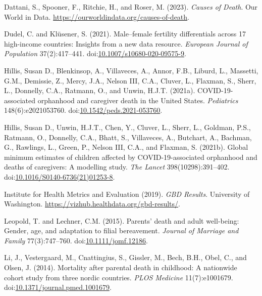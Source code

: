 \documentclass[
  11pt,
  letterpaper,
]{article}
\newlength{\cslhangindent}
\newlength{\cslentryspacingunit} %
\newenvironment{CSLReferences}[2] %
 {%
  \setlength{\parindent}{0pt}
  \ifodd #1
  \let\oldpar\par
  \def\par{\hangindent=\cslhangindent\oldpar}
  \fi
  \setlength{\parskip}{#2\cslentryspacingunit}
 }%
 {}
\begin{document}
\begin{CSLReferences}{1}{0}
\leavevmode{}%
Dattani, S., Spooner, F., Ritchie, H., and Roser, M. (2023). \emph{Causes of Death}. Our World in Data. \url{https://ourworldindata.org/causes-of-death}.

\leavevmode{}%
Dudel, C. and Klüsener, S. (2021). Male--female fertility differentials across 17 high-income countries: Insights from a new data resource. \emph{European Journal of Population} 37(2):417--441. doi:\href{https://doi.org/10.1007/s10680-020-09575-9}{10.1007/s10680-020-09575-9}.

\leavevmode{}%
Hillis, Susan D., Blenkinsop, A., Villaveces, A., Annor, F.B., Liburd, L., Massetti, G.M., Demissie, Z., Mercy, J.A., Nelson III, C.A., Cluver, L., Flaxman, S., Sherr, L., Donnelly, C.A., Ratmann, O., and Unwin, H.J.T. (2021a). COVID-19-associated orphanhood and caregiver death in the {U}nited {S}tates. \emph{Pediatrics} 148(6):e2021053760. doi:\href{https://doi.org/10.1542/peds.2021-053760}{10.1542/peds.2021-053760}.

\leavevmode{}%
Hillis, Susan D., Unwin, H.J.T., Chen, Y., Cluver, L., Sherr, L., Goldman, P.S., Ratmann, O., Donnelly, C.A., Bhatt, S., Villaveces, A., Butchart, A., Bachman, G., Rawlings, L., Green, P., Nelson III, C.A., and Flaxman, S. (2021b). Global minimum estimates of children affected by COVID-19-associated orphanhood and deaths of caregivers: A modelling study. \emph{The Lancet} 398(10298):391--402. doi:\href{https://doi.org/10.1016/S0140-6736(21)01253-8}{10.1016/S0140-6736(21)01253-8}.

\leavevmode{}%
Institute for Health Metrics and Evaluation (2019). \emph{GBD Results}. University of Washington. \url{https://vizhub.healthdata.org/gbd-results/}.

\leavevmode{}%
Leopold, T. and Lechner, C.M. (2015). Parents' death and adult well-being: Gender, age, and adaptation to filial bereavement. \emph{Journal of Marriage and Family} 77(3):747--760. doi:\href{https://doi.org/10.1111/jomf.12186}{10.1111/jomf.12186}.

\leavevmode{}%
Li, J., Vestergaard, M., Cnattingius, S., Gissler, M., Bech, B.H., Obel, C., and Olsen, J. (2014). Mortality after parental death in childhood: A nationwide cohort study from three nordic countries. \emph{PLOS Medicine} 11(7):e1001679. doi:\href{https://doi.org/10.1371/journal.pmed.1001679}{10.1371/journal.pmed.1001679}.


\end{CSLReferences}
\end{document}
